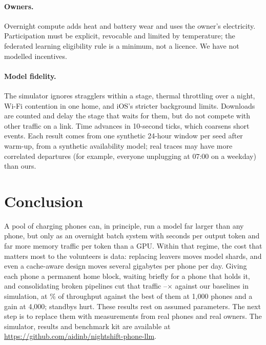 \documentclass[sigconf,nonacm]{acmart}
\begin{document}
\paragraph{Owners.} Overnight compute adds heat and battery wear and uses the
owner's electricity. Participation must be explicit, revocable and limited by
temperature; the federated learning eligibility rule is a minimum, not a
licence. We have not modelled incentives.
\paragraph{Model fidelity.} The simulator ignores stragglers within a stage,
thermal throttling over a night, Wi-Fi contention in one home, and iOS's
stricter background limits. Downloads are counted and delay the stage that
waits for them, but do not compete with other traffic on a link. Time
advances in 10-second ticks, which coarsens short events. Each result comes
from one synthetic 24-hour window per seed after warm-up, from a synthetic
availability model; real traces may have more correlated departures (for
example, everyone unplugging at 07:00 on a weekday) than ours.

\section{Conclusion}

A pool of charging phones can, in principle, run a model far larger than any
phone, but only as an overnight batch system with seconds per output token
and far more memory traffic per token than a GPU. Within that regime, the cost
that matters most to the volunteers is data: replacing leavers moves model
shards, and even a cache-aware design moves several gigabytes per phone per
day. Giving each phone a permanent home block, waiting briefly for a phone that
holds it, and consolidating broken pipelines cut that traffic
\GBRatioBaseMin--\GBRatioBaseMax$\times$ against our baselines in simulation,
at \NSbehindConsolPct\% of throughput against the best of them at 1,000 phones
and a gain at 4,000; standbys hurt. These results rest on
assumed parameters. The next step is to replace them with measurements from
real phones and real owners.
\ifdefined\arxiv
The simulator, results and benchmark kit are available at
\url{https://github.com/aidinb/nightshift-phone-llm}.
\fi



\end{document}
